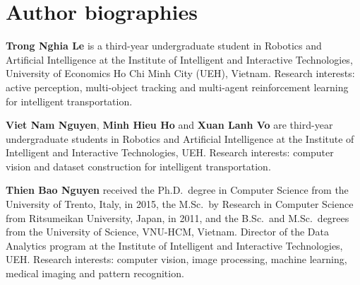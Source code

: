 \documentclass[twocolumn]{svjour3}
\begin{document}



\section*{Author biographies}
\small
\noindent\textbf{Trong Nghia Le} is a third-year undergraduate student in
Robotics and Artificial Intelligence at the Institute of Intelligent and
Interactive Technologies, University of Economics Ho Chi Minh City (UEH),
Vietnam. Research interests: active perception, multi-object tracking and
multi-agent reinforcement learning for intelligent transportation.

\smallskip
\noindent\textbf{Viet Nam Nguyen}, \textbf{Minh Hieu Ho} and \textbf{Xuan Lanh Vo}
are third-year undergraduate students in Robotics and Artificial Intelligence at
the Institute of Intelligent and Interactive Technologies, UEH. Research
interests: computer vision and dataset construction for intelligent
transportation.

\smallskip
\noindent\textbf{Thien Bao Nguyen} received the Ph.D.\ degree in Computer Science
from the University of Trento, Italy, in 2015, the M.Sc.\ by Research in Computer
Science from Ritsumeikan University, Japan, in 2011, and the B.Sc.\ and M.Sc.\
degrees from the University of Science, VNU-HCM, Vietnam. Director of the Data
Analytics program at the Institute of Intelligent and Interactive Technologies,
UEH. Research interests: computer vision, image processing, machine learning,
medical imaging and pattern recognition.
\end{document}
